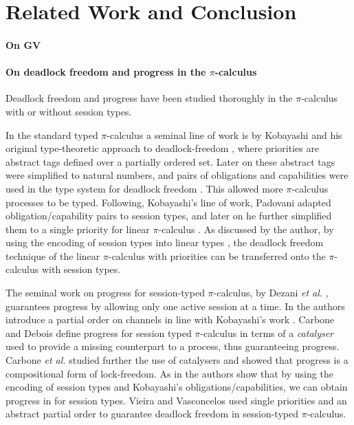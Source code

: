 \documentclass[main.tex]{subfiles}
\begin{document}
\section{Related Work and Conclusion}

\paragraph{On GV}

\paragraph{On deadlock freedom and progress in the $\pi$-calculus}
Deadlock freedom and progress have been studied thoroughly in the $\pi$-calculus with or without session types.

In the standard typed $\pi$-calculus a seminal line of work is by Kobayashi and his original type-theoretic approach to deadlock-freedom \cite{K98}, where priorities are abstract tags defined over a partially ordered set. Later on these abstract tags were simplified to natural numbers, and pairs of obligations and capabilities were used in the type system for deadlock freedom \cite{K02,K06}. This allowed more $\pi$-calculus processes to be typed. Following, Kobayashi's line of work, Padovani \cite{P13} adapted obligation/capability pairs to session types, and later on he further simplified them to a single priority for linear $\pi$-calculus \cite{P14}. As discussed by the author, by using the encoding of session types into linear types \cite{Koba07,DGS12,D14,Dardha16}, the deadlock freedom technique of the linear $\pi$-calculus with priorities can be transferred onto the $\pi$-calculus with session types.

The seminal work on progress for session-typed $\pi$-calculus, by Dezani \emph{et al.} \cite{DMYD06}, guarantees progress by allowing only one active session at a time. In \cite{DLY07} the authors introduce a partial order on channels in line with Kobayashi's work \cite{K98}. Carbone and Debois \cite{CD10} define progress for session typed $\pi$-calculus in terms of a \emph{catalyser} used to provide a missing counterpart to a process, thus guaranteeing progress.
Carbone \emph{et al.} \cite{CDM14} studied further the use of catalysers and showed that progress is a compositional form of lock-freedom. As in \cite{P14} the authors show that by using the encoding of session types \cite{DGS12} and Kobayashi's obligations/capabilities, we can obtain progress in for session types. Vieira and Vasconcelos \cite{VieiraV13} used single priorities and an abstract partial order to guarantee deadlock freedom in session-typed $\pi$-calculus.
\end{document}
